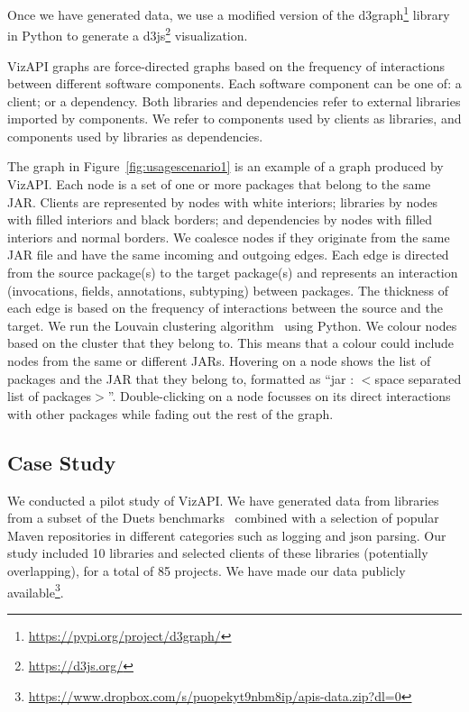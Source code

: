 Once we have generated data, we use a modified version
of the d3graph\footnote{\url{https://pypi.org/project/d3graph/}} library in Python to generate a d3js\footnote{\url{https://d3js.org/}}
visualization. 

VizAPI graphs are force-directed graphs based on the
frequency of interactions between different software components. 
Each software component can be one of: a client; or a dependency.
Both libraries and dependencies refer to external libraries imported by components.
We refer to components used by clients as libraries, and components used by libraries
as dependencies. 

The graph in Figure~\ref{fig:usagescenario1}
is an example of a graph produced by VizAPI.
Each node is a set of one or more packages that belong to the same JAR. 
Clients are represented by nodes with white interiors; libraries by nodes with filled interiors and black borders;
and dependencies by nodes with filled interiors and normal borders.
We coalesce nodes if they originate from the same 
JAR file and have the same incoming and outgoing edges. Each edge is directed 
from the source package(s) to the target package(s) and represents an interaction 
(invocations, fields, annotations, subtyping) between packages. 
The thickness of each edge is based on the frequency of interactions between the source and the target.
We run the Louvain clustering algorithm~\cite{blondel2008fast} using Python. 
We colour nodes based on the cluster that they belong to. 
This means that a colour could include nodes from the same or different JARs.
Hovering on a node shows the list of packages and 
the JAR that they belong to, 
formatted as “jar : $<$space separated list of packages$>$”. 
Double-clicking on a node focusses on its direct interactions with other packages while fading out the rest of the graph.

\subsection{Case Study}
\label{subsec:evaluation}

We conducted a pilot study of VizAPI.
We have generated data from libraries from a subset of the
Duets benchmarks~\cite{durieux21} combined with a selection of
popular Maven repositories 
in different categories such as logging and json parsing.
Our study included 10 libraries and
selected clients of these libraries (potentially overlapping), for a total of 85 projects.
We have made our data publicly available\footnote{\url{https://www.dropbox.com/s/puopekyt9nbm8ip/apis-data.zip?dl=0}}.

